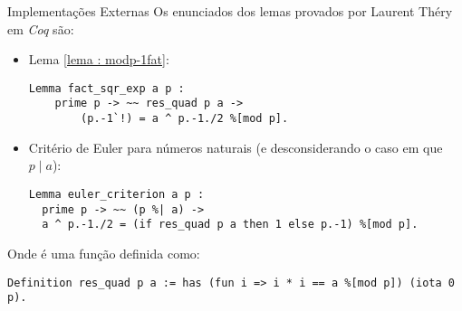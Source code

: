 \begin{frame}[fragile]{Implementações Externas}
    Os enunciados dos lemas provados por Laurent Théry em \textit{Coq} são:

    \begin{itemize}
        \item Lema \ref{lema : modp-1fat}:
            \begin{lstlisting}[language=coq,frame=single,tabsize=1]
Lemma fact_sqr_exp a p :
    prime p -> ~~ res_quad p a -> 
        (p.-1`!) = a ^ p.-1./2 %[mod p].              
            \end{lstlisting}

        \item Critério de Euler para números naturais (e desconsiderando o caso em que $p \mid a$):
            \begin{lstlisting}[language=coq,frame=single,tabsize=1]
Lemma euler_criterion a p : 
  prime p -> ~~ (p %| a) -> 
  a ^ p.-1./2 = (if res_quad p a then 1 else p.-1) %[mod p].
            \end{lstlisting}
    \end{itemize}

    Onde  é uma função definida como:
        \begin{lstlisting}[language=coq,frame=single,tabsize=1]
Definition res_quad p a := has (fun i => i * i == a %[mod p]) (iota 0 p).
        \end{lstlisting}
    
\end{frame}

    
    

